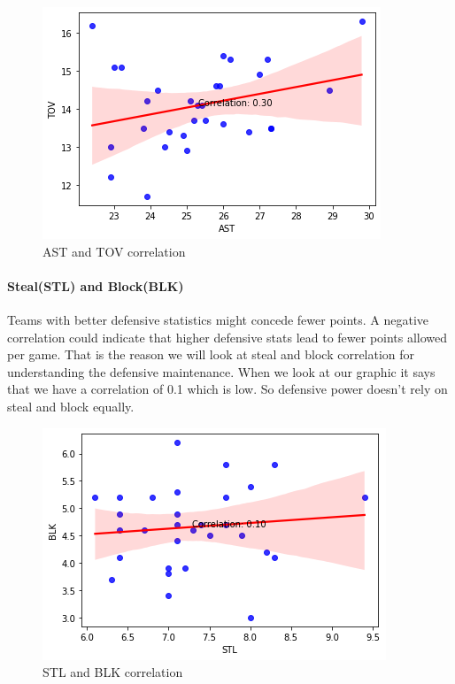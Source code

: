 \documentclass[conference]{IEEEtran}
\begin{document}
\begin{figure}[h]
    \centering
    \includegraphics[scale=0.6]{AST-TOV-COR.png}
    \caption{AST and TOV correlation}
    \label{fig:enter-label}
\end{figure}


\paragraph {Steal(STL) and Block(BLK)}
Teams with better defensive statistics might concede fewer points. A negative correlation could indicate that higher defensive stats lead to fewer points allowed per game. That is the reason we will look at steal and block correlation for understanding the defensive maintenance. When we look at our graphic it says that we have a correlation of 0.1 which is low. So defensive power doesn't rely on steal and block equally.

\begin{figure}[h]
    \centering
    \includegraphics[scale=0.6]{STL-BLK-COR.png}
    \caption{STL and BLK correlation}
    \label{fig:enter-label}
\end{figure}
\vspace{\baselineskip}
\end{document}
